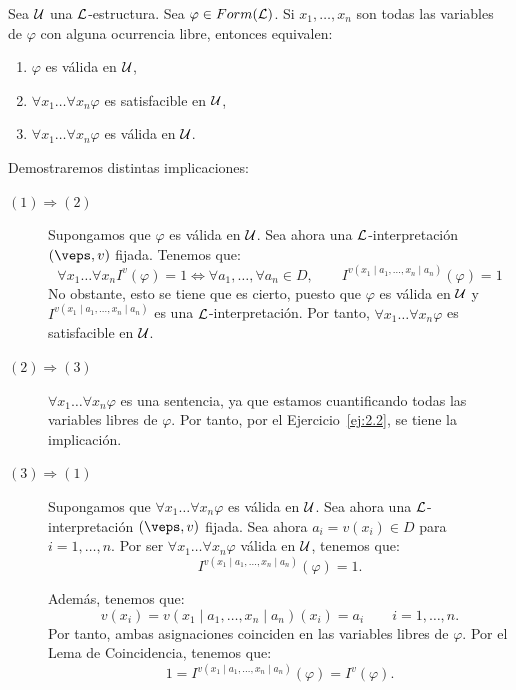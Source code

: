 \begin{ejercicio}\label{ej:2.4}
    Sea $\mathcal{U}$ una $\mathcal{L}$-estructura. Sea $\varphi \in Form(\mathcal{L})$. Si $x_1, \ldots, x_n$ son todas las variables de $\varphi$ con alguna ocurrencia libre, entonces equivalen:
    \begin{enumerate}
        \item $\varphi$ es válida en $\mathcal{U}$,
        \item $\forall x_1 \ldots \forall x_n \varphi$ es satisfacible en $\mathcal{U}$,
        \item $\forall x_1 \ldots \forall x_n \varphi$ es válida en $\mathcal{U}$.
    \end{enumerate}

    Demostraremos distintas implicaciones:
    \begin{description}
        \item[$(1)\Longrightarrow(2)$] Supongamos que $\varphi$ es válida en $\mathcal{U}$. Sea ahora una $\mathcal{L}$-interpretación $(\veps,v)$ fijada. Tenemos que:
        \begin{equation*}
            \forall x_1 \ldots \forall x_n I^v(\varphi) = 1\iff \forall a_1,\ldots,\forall a_n\in D,\qquad I^{v(x_1\mid a_1,\ldots,x_n\mid a_n)}(\varphi) = 1
        \end{equation*}
        No obstante, esto se tiene que es cierto, puesto que $\varphi$ es válida en $\mathcal{U}$ y $I^{v(x_1\mid a_1,\ldots,x_n\mid a_n)}$ es una $\mathcal{L}$-interpretación. Por tanto, $\forall x_1 \ldots \forall x_n \varphi$ es satisfacible en $\mathcal{U}$.

        \item[$(2)\Longrightarrow(3)$] $\forall x_1 \ldots \forall x_n \varphi$ es una sentencia, ya que estamos cuantificando todas las variables libres de $\varphi$. Por tanto, por el Ejercicio~\ref{ej:2.2}, se tiene la implicación.
        
        \item[$(3)\Longrightarrow(1)$] Supongamos que $\forall x_1 \ldots \forall x_n \varphi$ es válida en $\mathcal{U}$. Sea ahora una $\mathcal{L}$-interpretación $(\veps,v)$ fijada. Sea ahora $a_i=v(x_i)\in D$ para $i=1,\ldots,n$. Por ser $\forall x_1 \ldots \forall x_n \varphi$ válida en $\mathcal{U}$, tenemos que:
        \begin{equation*}
            I^{v(x_1\mid a_1,\ldots,x_n\mid a_n)}(\varphi) = 1.
        \end{equation*}

        Además, tenemos que:
        \begin{equation*}
            v(x_i) = v(x_1\mid a_1,\ldots,x_n\mid a_n)(x_i) = a_i\qquad i=1,\ldots,n.
        \end{equation*}
        Por tanto, ambas asignaciones coinciden en las variables libres de $\varphi$. Por el Lema de Coincidencia, tenemos que:
        \begin{equation*}
            1 = I^{v(x_1\mid a_1,\ldots,x_n\mid a_n)}(\varphi) = I^v(\varphi).
        \end{equation*}


\end{description}
\end{ejercicio}
